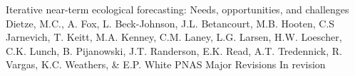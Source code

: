 

\begin{pubentries}


  \pubentry
    {Iterative near-term ecological forecasting: Needs, opportunities, and challenges} %
    {Dietze, M.C., A. Fox, L. Beck-Johnson, J.L. Betancourt, M.B. Hooten, C.S Jarnevich, T. Keitt, M.A. Kenney, C.M. Laney, L.G. Larsen, H.W. Loescher, C.K. Lunch, B. Pijanowski, J.T. Randerson, E.K. Read, A.T. Tredennick, R. Vargas, K.C. Weathers, \& E.P. White} %
    {PNAS} %
    {Major Revisions} %
    {In revision} %

\end{pubentries}
